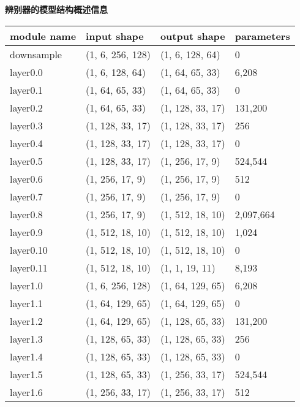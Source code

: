 \textbf{辨别器的模型结构概述信息}
\begin{table}[H]
    \begin{tabular}{llll}
        \toprule
        module name &        input shape &       output shape & parameters \\
        \midrule
        downsample &   (1, 6, 256, 128) &    (1, 6, 128, 64) &          0 \\
        layer0.0 &    (1, 6, 128, 64) &    (1, 64, 65, 33) &      6,208 \\
        layer0.1 &    (1, 64, 65, 33) &    (1, 64, 65, 33) &          0 \\
        layer0.2 &    (1, 64, 65, 33) &   (1, 128, 33, 17) &    131,200 \\
        layer0.3 &   (1, 128, 33, 17) &   (1, 128, 33, 17) &        256 \\
        layer0.4 &   (1, 128, 33, 17) &   (1, 128, 33, 17) &          0 \\
        layer0.5 &   (1, 128, 33, 17) &    (1, 256, 17, 9) &    524,544 \\
        layer0.6 &    (1, 256, 17, 9) &    (1, 256, 17, 9) &        512 \\
        layer0.7 &    (1, 256, 17, 9) &    (1, 256, 17, 9) &          0 \\
        layer0.8 &    (1, 256, 17, 9) &   (1, 512, 18, 10) &  2,097,664 \\
        layer0.9 &   (1, 512, 18, 10) &   (1, 512, 18, 10) &      1,024 \\
        layer0.10 &   (1, 512, 18, 10) &   (1, 512, 18, 10) &          0 \\
        layer0.11 &   (1, 512, 18, 10) &     (1, 1, 19, 11) &      8,193 \\
        layer1.0 &   (1, 6, 256, 128) &   (1, 64, 129, 65) &      6,208 \\
        layer1.1 &   (1, 64, 129, 65) &   (1, 64, 129, 65) &          0 \\
        layer1.2 &   (1, 64, 129, 65) &   (1, 128, 65, 33) &    131,200 \\
        layer1.3 &   (1, 128, 65, 33) &   (1, 128, 65, 33) &        256 \\
        layer1.4 &   (1, 128, 65, 33) &   (1, 128, 65, 33) &          0 \\
        layer1.5 &   (1, 128, 65, 33) &   (1, 256, 33, 17) &    524,544 \\
        layer1.6 &   (1, 256, 33, 17) &   (1, 256, 33, 17) &        512 \\

\end{tabular}
\end{table}
